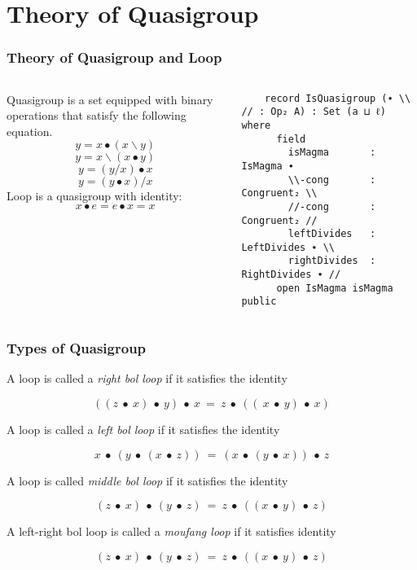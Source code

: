 \documentclass[xcolor={dvipsnames}]{beamer}
\begin{document}
\section{Theory of Quasigroup}

\begin{frame}[fragile]
  \frametitle{Theory of Quasigroup and Loop}  
  \begin{columns}
    \begin{column}{0.4\textwidth}
      Quasigroup is a set equipped with binary operations that satisfy the
      following equation.
            \[y=x∙(x\backslash y)\]
            \[y=x\backslash(x∙y)\]
            \[y=(y/x)∙x\]
            \[y=(y∙x)/x\]
      Loop is a quasigroup with identity:
      \[x∙e=e∙x=x\]
    \end{column}
    \hfill
    \begin{column}{0.575\textwidth}
\begin{verbatim}
    record IsQuasigroup (∙ \\ // : Op₂ A) : Set (a ⊔ ℓ) where
      field
        isMagma       : IsMagma ∙
        \\-cong       : Congruent₂ \\
        //-cong       : Congruent₂ //
        leftDivides   : LeftDivides ∙ \\
        rightDivides  : RightDivides ∙ //
      open IsMagma isMagma public
\end{verbatim}
    \end{column}
  \end{columns}
\end{frame}

\begin{frame}[fragile]
  \frametitle{Types of Quasigroup}

  A loop is called a \textit{right bol loop} if it satisfies the identity

   \[((z\ ∙\ x)\ ∙\ y)\ ∙\ x\ =\ z\ ∙\ ((\ x\ ∙\ y)\ ∙\ x)\]

  A loop is called a \textit{left bol loop} if it satisfies the identity

   \[x\ ∙\ (y\ ∙\ (x\ ∙\ z))\ =\ (x\ ∙\ (y\ ∙\ x))\ ∙\ z\]

  A loop is called \textit{middle bol loop} if it satisfies the identity

  \[(z\ ∙\ x)\ ∙\ (y\ ∙\ z)\ =\ z\ ∙\ ((x\ ∙\ y)\ ∙\ z)\]

  A left-right bol loop is called a \textit{moufang loop} if it satisfies identity

  \[(z\ ∙\ x)\ ∙\ (y\ ∙\ z)\ =\ z\ ∙\ ((x\ ∙\ y)\ ∙\ z)\]

\end{frame}
\end{document}
